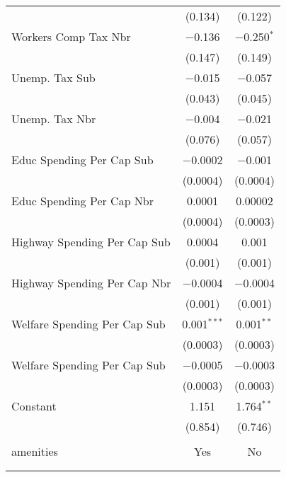 \begin{table}[!htbp]
\begin{tabular}{@{\extracolsep{5pt}}lcc}
  & (0.134) & (0.122) \\ 
  Workers Comp Tax Nbr & $-$0.136 & $-$0.250$^{*}$ \\ 
  & (0.147) & (0.149) \\ 
  Unemp. Tax Sub & $-$0.015 & $-$0.057 \\ 
  & (0.043) & (0.045) \\ 
  Unemp. Tax Nbr & $-$0.004 & $-$0.021 \\ 
  & (0.076) & (0.057) \\ 
  Educ Spending Per Cap Sub & $-$0.0002 & $-$0.001 \\ 
  & (0.0004) & (0.0004) \\ 
  Educ Spending Per Cap Nbr & 0.0001 & 0.00002 \\ 
  & (0.0004) & (0.0003) \\ 
  Highway Spending Per Cap Sub & 0.0004 & 0.001 \\ 
  & (0.001) & (0.001) \\ 
  Highway Spending Per Cap Nbr & $-$0.0004 & $-$0.0004 \\ 
  & (0.001) & (0.001) \\ 
  Welfare Spending Per Cap Sub & 0.001$^{***}$ & 0.001$^{**}$ \\ 
  & (0.0003) & (0.0003) \\ 
  Welfare Spending Per Cap Sub & $-$0.0005 & $-$0.0003 \\ 
  & (0.0003) & (0.0003) \\ 
  Constant & 1.151 & 1.764$^{**}$ \\ 
  & (0.854) & (0.746) \\ 
 \hline \\[-1.8ex] 
amenities & Yes & No \\ 
\hline \\[-1.8ex] 
\hline 
\hline \\[-1.8ex] 
\end{tabular} 
\end{table} 
